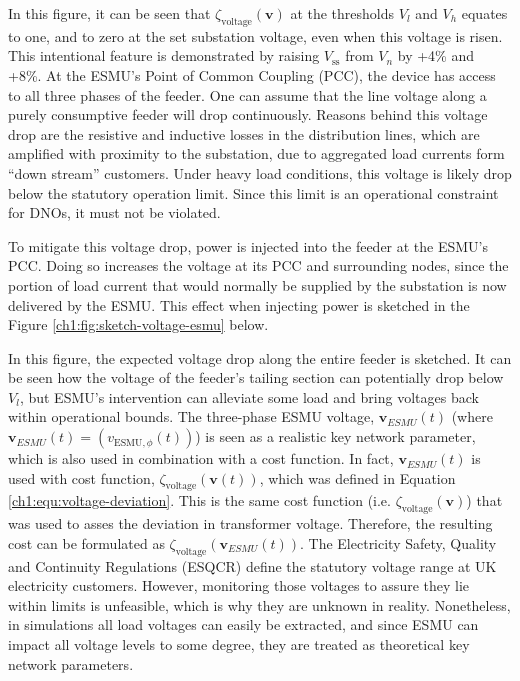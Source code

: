 

In this figure, it can be seen that $\zeta_\text{voltage}(\textbf{v})$ at the thresholds $V_l$ and $V_h$ equates to one, and to zero at the set substation voltage, even when this voltage is risen.
This intentional feature is demonstrated by raising $V_\text{ss}$ from $V_n$ by +4\% and +8\%.
At the ESMU's Point of Common Coupling (PCC), the device has access to all three phases of the feeder.
One can assume that the line voltage along a purely consumptive feeder will drop continuously.
Reasons behind this voltage drop are the resistive and inductive losses in the distribution lines, which are amplified with proximity to the substation, due to aggregated load currents form ``down stream'' customers.
Under heavy load conditions, this voltage is likely drop below the statutory operation limit.
Since this limit is an operational constraint for DNOs, it must not be violated.

To mitigate this voltage drop, power is injected into the feeder at the ESMU's PCC.
Doing so increases the voltage at its PCC and surrounding nodes, since the portion of load current that would normally be supplied by the substation is now delivered by the ESMU.
This effect when injecting power is sketched in the Figure \ref{ch1:fig:sketch-voltage-esmu} below.




In this figure, the expected voltage drop along the entire feeder is sketched. 
It can be seen how the voltage of the feeder's tailing section can potentially drop below $V_l$, but ESMU's intervention can alleviate some load and bring voltages back within operational bounds.
The three-phase ESMU voltage, $\textbf{v}_{ESMU}(t)$ (where $\textbf{v}_{ESMU}(t) = (v_{\text{ESMU},\phi}(t))$) is seen as a realistic key network parameter, which is also used in combination with a cost function.
In fact, $\textbf{v}_{ESMU}(t)$ is used with cost function, $\zeta_\text{voltage}(\textbf{v}(t))$, which was defined in Equation \ref{ch1:equ:voltage-deviation}.
This is the same cost function (i.e. $\zeta_\text{voltage}(\textbf{v})$) that was used to asses the deviation in transformer voltage.
Therefore, the resulting cost can be formulated as $\zeta_\text{voltage}(\textbf{v}_{ESMU}(t))$.
The Electricity Safety, Quality and Continuity Regulations (ESQCR) define the statutory voltage range at UK electricity customers.
However, monitoring those voltages to assure they lie within limits is unfeasible, which is why they are unknown in reality.
Nonetheless, in simulations all load voltages can easily be extracted, and since ESMU can impact all voltage levels to some degree, they are treated as theoretical key network parameters.

